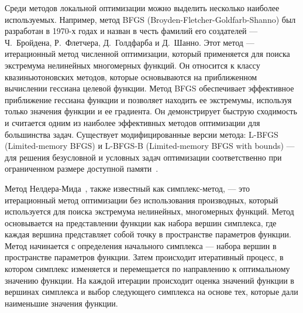 Среди методов локальной оптимизации можно выделить несколько наиболее используемых.
Например, метод BFGS (Broyden-Fletcher-Goldfarb-Shanno) \cite{broyden1970convergence,fletcher1970new,goldfarb1970family,shanno1970conditioning} был разработан в 1970-х годах и назван в честь фамилий его создателей --- Ч.~Бройдена, Р.~Флетчера, Д.~Голдфарба и Д.~Шанно.
Этот метод --- итерационный метод численной оптимизации, который применяется для поиска экстремума нелинейных многомерных функций.
Он относится к классу квазиньютоновских методов, которые основываются на приближенном вычислении гессиана целевой функции.
Метод BFGS обеспечивает эффективное приближение гессиана функции и позволяет находить ее экстремумы, используя только значения функции и ее градиента.
Он демонстрирует быструю сходимость и считается одним из наиболее эффективных методов оптимизации для большинства задач.
Существует модифицированные версии метода: L-BFGS (Limited-memory BFGS) и L-BFGS-B (Limited-memory BFGS with bounds) --- для решения безусловной и условных задач оптимизации соответственно при ограниченном размере доступной памяти~\cite{byrd1995limited}.

Метод Нелдера-Мида~\cite{nelder1965simplex}, также известный как симплекс-метод, --- это итерационный метод оптимизации без использования производных, который используется для поиска экстремума нелинейных, многомерных функций. 
Метод основывается на представлении функции как набора вершин симплекса, где каждая вершина представляет собой точку в пространстве параметров функции.
Метод начинается с определения начального симплекса --- набора вершин в пространстве параметров функции.
Затем происходит итеративный процесс, в котором симплекс изменяется и перемещается по направлению к оптимальному значению функции.
На каждой итерации происходит оценка значений функции в вершинах симплекса и выбор следующего симплекса на основе тех, которые дали наименьшие значения функции.

